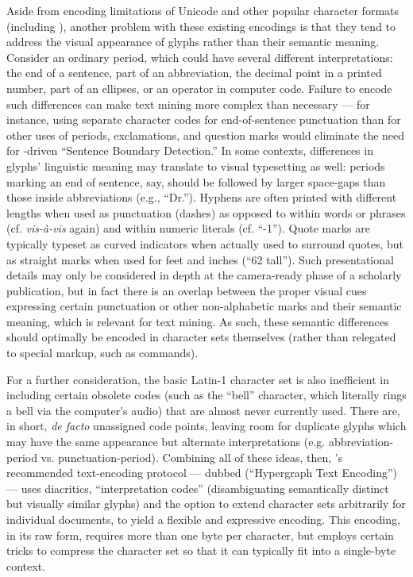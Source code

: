 \documentclass[12pt,letterpaper]{article}
\newcommand{\HTXN}{\resizebox{!}{7.5pt}{\ATexttclr{HTXN}}}
\newcommand{\HGDM}{\resizebox{!}{7.5pt}{\ATexttclr{HGDM}}}
\newcommand{\ATexttclr}[1]{\textcolor{tcolor}{\textbf{#1}}}
\newcommand{\AI}{\resizebox{!}{7.5pt}{\AcronymText{AI}}}
\newcommand{\ASCII}{\resizebox{!}{8pt}{\AcronymText{ASCII}}}
\newcommand{\textscc}[1]{{\color{orr!35!black}{{%
{\textsc{\textbf{#1}}}}}}}
\newcommand{\AcronymText}[1]{{\textscc{#1}}}
\newcommand{\p}[1]{

\vspace{.7em}#1}
\newcommand{\q}[1]{{\fontfamily{qcr}\selectfont ``}#1{\fontfamily{qcr}\selectfont ''}}
\let\OldLaTeX\LaTeX
\renewcommand{\LaTeX}{\resizebox{!}{8pt}{\color{orr!35!black}{\OldLaTeX}}}
\begin{document}
{\p{Aside from encoding limitations of Unicode and other 
popular character formats (including \ASCII{}), another 
problem with these existing encodings is that they 
tend to address the visual appearance of glyphs 
rather than their semantic meaning.  Consider an 
ordinary period, which could have several different 
interpretations: the end of a sentence, part of an 
abbreviation, the decimal point in a printed number, 
part of an ellipses, or an operator in computer code.  
Failure to encode such differences can make 
text mining more complex than necessary --- for instance, 
using separate character codes for end-of-sentence 
punctuation than for other uses of periods, exclamations, 
and question marks would eliminate the need for 
\AI{}-driven \q{Sentence Boundary Detection.}  In some 
contexts, differences in glyphs' linguistic meaning 
may translate to visual typesetting as well: periods 
marking an end of sentence, say, should be followed 
by larger space-gaps than those inside 
abbreviations (e.g., \q{Dr.}).  Hyphens are often printed 
with different lengths when used as punctuation (dashes) 
as opposed to within words or phrases (cf. \textit{vis-\`{a}-vis} 
again) and within numeric literals (cf. \q{-1}).  Quote 
marks are typically typeset as curved indicators when actually 
used to surround quotes, but as straight marks when used 
for feet and inches (\q{6\textquotesingle{}2\textquotedbl{} tall}).  
Such presentational details may only be considered in 
depth at the camera-ready phase of a scholarly publication, 
but in fact there is an overlap between the proper 
visual cues expressing certain punctuation or other 
non-alphabetic marks and their semantic meaning, which is 
relevant for text mining.  As such, these semantic 
differences should optimally be encoded in character 
sets themselves (rather than relegated to special 
markup, such as \LaTeX{} commands).}

\p{For a further consideration, the basic 
Latin-1 character set is also inefficient in 
including certain obsolete \ASCII{} codes (such as the 
\q{bell} character, which literally rings a bell via the 
computer's audio) that are almost never currently used.  
There are, in short, \textit{de facto} unassigned 
code points, leaving room for duplicate glyphs which 
may have the same appearance but alternate 
interpretations (e.g. abbreviation-period 
vs. punctuation-period).  Combining all of these 
ideas, then, \HGDM{}'s recommended text-encoding 
protocol --- dubbed \HTXN{} (\q{Hypergraph Text 
Encoding}) --- uses diacritics, \q{interpretation 
codes} (disambiguating semantically distinct but 
visually similar glyphs) and the option to 
extend character sets arbitrarily for individual 
documents, to yield a flexible and expressive 
encoding.  This encoding, in its raw form, requires more than 
one byte per character, but \HTXN{} employs 
certain tricks to compress the character set 
so that it can typically fit into a single-byte context.}

}
\end{document}
